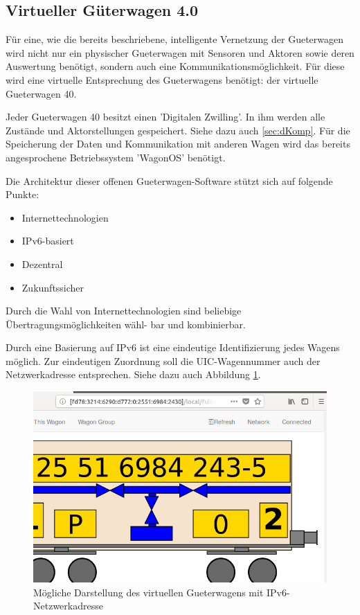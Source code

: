 \subsection{Virtueller Güterwagen 4.0}
Für eine, wie die bereits beschriebene, intelligente Vernetzung der \gls{Gueterwagen} wird nicht nur ein physischer \gls{Gueterwagen} mit Sensoren und Aktoren sowie deren Auswertung benötigt, sondern auch eine Kommunikationsmöglichkeit. Für diese wird eine virtuelle Entsprechung des \gls{Gueterwagen}s benötigt: der virtuelle \gls{Gueterwagen 40}.\par
Jeder \gls{Gueterwagen 40} besitzt einen 'Digitalen Zwilling'. In ihm werden alle Zustände und Aktorstellungen gespeichert. Siehe dazu auch \ref{sec:dKomp}. Für die Speicherung der Daten und Kommunikation mit anderen Wagen wird das bereits angesprochene Betriebssystem '\gls{WagonOS}' benötigt.\par
Die Architektur dieser offenen \gls{Gueterwagen}-Software stützt sich auf folgende Punkte:
\begin{itemize}
    \item Internettechnologien
    \item IPv6-basiert
    \item Dezentral
    \item Zukunftssicher
\end{itemize}
Durch die Wahl von Internettechnologien sind beliebige Übertragungsmöglichkeiten wähl- bar und kombinierbar.\par
Durch eine Basierung auf IPv6 ist eine eindeutige Identifizierung jedes Wagens möglich. Zur eindeutigen Zuordnung soll die UIC-Wagennummer auch der Netzwerkadresse entsprechen. Siehe dazu auch Abbildung \ref{fig:IPv6}.\par
\begin{figure}
    \centering
    \includegraphics[width=\textwidth]{Bilder/ipv6_concept.png}
    \caption{Mögliche Darstellung des virtuellen \gls{Gueterwagen}s mit IPv6-Netzwerkadresse\cite{GAK}}
    \label{fig:IPv6}
\end{figure}
